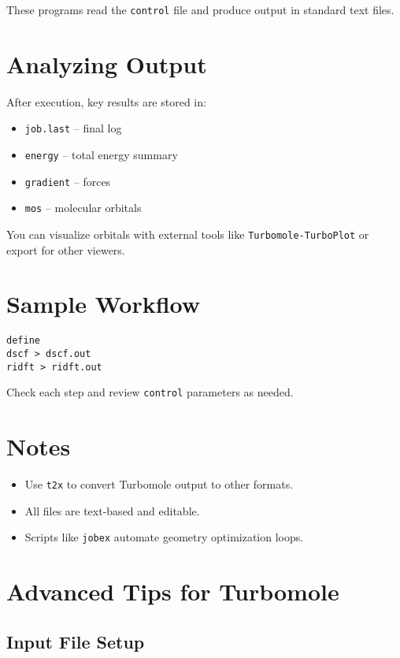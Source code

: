 These programs read the \texttt{control} file and produce output in standard text files.

\section{Analyzing Output}

After execution, key results are stored in:

\begin{itemize}
    \item \texttt{job.last} – final log
    \item \texttt{energy} – total energy summary
    \item \texttt{gradient} – forces
    \item \texttt{mos} – molecular orbitals
\end{itemize}

You can visualize orbitals with external tools like \texttt{Turbomole-TurboPlot} or export for other viewers.

\section{Sample Workflow}

\begin{verbatim}
define
dscf > dscf.out
ridft > ridft.out
\end{verbatim}

Check each step and review \texttt{control} parameters as needed.

\section*{Notes}
\begin{itemize}
    \item Use \texttt{t2x} to convert Turbomole output to other formats.
    \item All files are text-based and editable.
    \item Scripts like \texttt{jobex} automate geometry optimization loops.
\end{itemize}


\section*{Advanced Tips for Turbomole}

\subsection*{Input File Setup}

